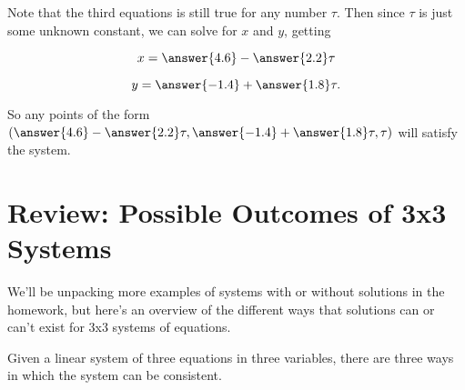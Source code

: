 \documentclass{ximera}
\begin{document}
\begin{solution}
        Note that the third equations is still true for any number $\tau$. Then since $\tau$ is just some unknown constant, we can solve for $x$ and $y$, getting

        $$x=\answer{4.6}-\answer{2.2}\tau$$
        
        $$y=\answer{-1.4}+\answer{1.8}\tau.$$

        So any points of the form $(\answer{4.6}-\answer{2.2}\tau, \answer{-1.4}+\answer{1.8}\tau, \tau)$ will satisfy the system.

    \end{solution}



\section*{Review: Possible Outcomes of 3x3 Systems}

We'll be unpacking more examples of systems with or without solutions in the homework, but here's an overview of the different ways that solutions can or can't exist for 3x3 systems of equations.

Given a linear system of three equations in three variables, there are three ways in which the system can be consistent.
\end{document}
